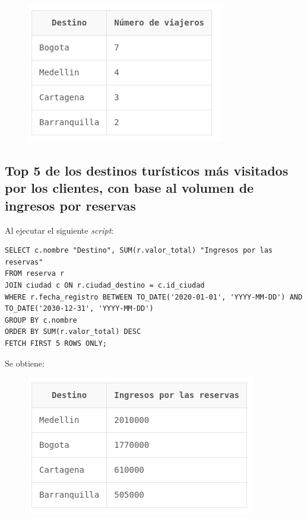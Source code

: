 \documentclass{article}
\begin{document}
\begin{figure}[h]
    \centering
    \includegraphics[width=0.75\linewidth]{img/Consulta_4.png}
\end{figure}


\newpage

\subsection{Top 5 de los destinos turísticos más visitados por los clientes, con base al volumen de ingresos por reservas}
Al ejecutar el siguiente \textit{script}:
\begin{lstlisting}
SELECT c.nombre "Destino", SUM(r.valor_total) "Ingresos por las reservas"
FROM reserva r
JOIN ciudad c ON r.ciudad_destino = c.id_ciudad
WHERE r.fecha_registro BETWEEN TO_DATE('2020-01-01', 'YYYY-MM-DD') AND TO_DATE('2030-12-31', 'YYYY-MM-DD')
GROUP BY c.nombre
ORDER BY SUM(r.valor_total) DESC
FETCH FIRST 5 ROWS ONLY;
\end{lstlisting}

Se obtiene:

\begin{figure}[h]
    \centering
    \includegraphics[width=0.75\linewidth]{img/Consulta_5.png}
\end{figure}
\end{document}
